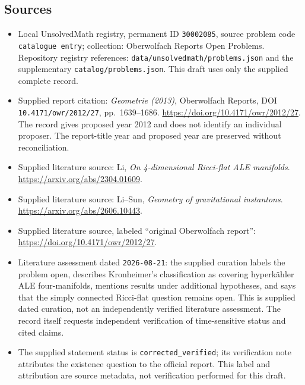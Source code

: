 \documentclass[11pt]{article}
\begin{document}
\subsection{Sources}
\begin{itemize}
\item Local UnsolvedMath registry, permanent ID \texttt{30002085}, source problem code \texttt{catalogue entry}; collection: Oberwolfach Reports Open Problems. Repository registry references: \texttt{data/unsolvedmath/problems.json} and the supplementary \texttt{catalog/problems.json}. This draft uses only the supplied complete record.
\item Supplied report citation: \emph{Geometrie (2013)}, Oberwolfach Reports, DOI \texttt{10.4171/owr/2012/27}, pp.~1639--1686. \url{https://doi.org/10.4171/owr/2012/27}. The record gives proposed year 2012 and does not identify an individual proposer. The report-title year and proposed year are preserved without reconciliation.
\item Supplied literature source: Li, \emph{On 4-dimensional Ricci-flat ALE manifolds}. \url{https://arxiv.org/abs/2304.01609}.
\item Supplied literature source: Li--Sun, \emph{Geometry of gravitational instantons}. \url{https://arxiv.org/abs/2606.10443}.
\item Supplied literature source, labeled ``original Oberwolfach report'': \url{https://doi.org/10.4171/owr/2012/27}.
\item Literature assessment dated \texttt{2026-08-21}: the supplied curation labels the problem open, describes Kronheimer's classification as covering hyperkähler ALE four-manifolds, mentions results under additional hypotheses, and says that the simply connected Ricci-flat question remains open. This is supplied dated curation, not an independently verified literature assessment. The record itself requests independent verification of time-sensitive status and cited claims.
\item The supplied statement status is \texttt{corrected\_verified}; its verification note attributes the existence question to the official report. This label and attribution are source metadata, not verification performed for this draft.
\end{itemize}
\end{document}
